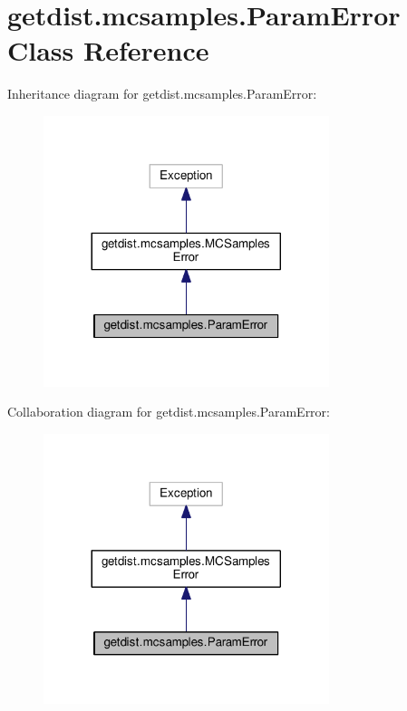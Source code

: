 \hypertarget{classgetdist_1_1mcsamples_1_1ParamError}{}\section{getdist.\+mcsamples.\+Param\+Error Class Reference}
\label{classgetdist_1_1mcsamples_1_1ParamError}


Inheritance diagram for getdist.\+mcsamples.\+Param\+Error\+:
\nopagebreak
\begin{figure}[H]
\begin{center}
\leavevmode
\includegraphics[width=236pt]{classgetdist_1_1mcsamples_1_1ParamError__inherit__graph}
\end{center}
\end{figure}


Collaboration diagram for getdist.\+mcsamples.\+Param\+Error\+:
\nopagebreak
\begin{figure}[H]
\begin{center}
\leavevmode
\includegraphics[width=236pt]{classgetdist_1_1mcsamples_1_1ParamError__coll__graph}
\end{center}
\end{figure}


